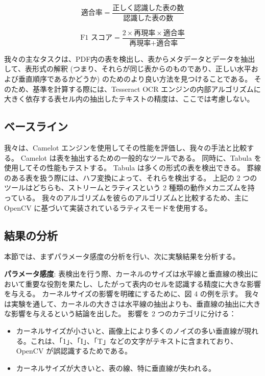 \documentclass[uplatex, twocolumn,10pt]{jsarticle}
\begin{document}
\begin{equation}
    \text{適合率} = \frac{\text{正しく認識した表の数}}{\text{認識した表の数}}
\end{equation}

\begin{equation}
    \text{F1 スコア} = \frac{2 \times \text{再現率} \times \text{適合率}}{\text{再現率} + \text{適合率}}
\end{equation}

我々の主なタスクは、PDF内の表を検出し、表からメタデータとデータを抽出して、表形式の解釈 (つまり、それらが同じ表からのものであり、正しい水平および垂直順序であるかどうか) のためのより良い方法を見つけることである。
そのため、基準を計算する際には、Tesseract OCR エンジンの内部アルゴリズムに大きく依存する表セル内の抽出したテキストの精度は、ここでは考慮しない。

\subsection{ベースライン}
我々は、Camelot エンジンを使用してその性能を評価し、我々の手法と比較する。
Camelot は表を抽出するための一般的なツールである。
同時に、Tabula を使用してその性能もテストする。
Tabula は多くの形式の表を検出できる。
罫線のある表を扱う際には、ハフ変換によって、それらを検出する。
上記の 2 つのツールはどちらも、ストリームとラティスという 2 種類の動作メカニズムを持っている。
我々のアルゴリズムを彼らのアルゴリズムと比較するため、主に OpenCV に基づいて実装されているラティスモードを使用する。

\subsection{結果の分析}
本節では、まずパラメータ感度の分析を行い、次に実験結果を分析する。

\textbf{パラメータ感度}:
表検出を行う際、カーネルのサイズは水平線と垂直線の検出において重要な役割を果たし、したがって表内のセルを認識する精度に大きな影響を与える。
カーネルサイズの影響を明確にするために、図 4 の例を示す。
我々は実験を通して、カーネルの大きさは水平線の抽出よりも、垂直線の抽出に大きな影響を与えるという結論を出した。
影響を 2 つのカテゴリに分ける：

\begin{itemize}
    \item カーネルサイズが小さいと、画像上により多くのノイズの多い垂直線が現れる。これは、「1」、「I」、「T」などの文字がテキストに含まれており、OpenCV が誤認識するためである。
    \item カーネルサイズが大きいと、表の線、特に垂直線が失われる。
\end{itemize}
\end{document}
